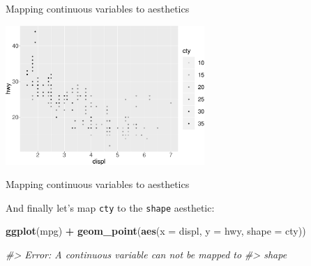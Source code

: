 \documentclass[ignorenonframetext,]{beamer}
\newenvironment{Shaded}{\begin{snugshade}}{\end{snugshade}}
\newcommand{\CommentTok}[1]{\textcolor[rgb]{0.56,0.35,0.01}{\textit{#1}}}
\newcommand{\DataTypeTok}[1]{\textcolor[rgb]{0.13,0.29,0.53}{#1}}
\newcommand{\KeywordTok}[1]{\textcolor[rgb]{0.13,0.29,0.53}{\textbf{#1}}}
\newcommand{\NormalTok}[1]{#1}
\newcommand{\OperatorTok}[1]{\textcolor[rgb]{0.81,0.36,0.00}{\textbf{#1}}}
\newcommand{\StringTok}[1]{\textcolor[rgb]{0.31,0.60,0.02}{#1}}
\begin{document}
\begin{frame}{Mapping continuous variables to aesthetics}
\protect\hypertarget{mapping-continuous-variables-to-aesthetics-6}{}

\begin{center}\includegraphics[height=200px]{data-visualization_files/figure-beamer/unnamed-chunk-26-1} \end{center}

\end{frame}

\begin{frame}[fragile]{Mapping continuous variables to aesthetics}
\protect\hypertarget{mapping-continuous-variables-to-aesthetics-7}{}

And finally let's map \texttt{cty} to the \texttt{shape} aesthetic:

\begin{Shaded}
\begin{Highlighting}[]
\KeywordTok{ggplot}\NormalTok{(mpg) }\OperatorTok{+}\StringTok{ }
\StringTok{  }\KeywordTok{geom_point}\NormalTok{(}\KeywordTok{aes}\NormalTok{(}\DataTypeTok{x =}\NormalTok{ displ, }\DataTypeTok{y =}\NormalTok{ hwy, }\DataTypeTok{shape =}\NormalTok{ cty))     }

\CommentTok{#> Error: A continuous variable can not be mapped to }
\CommentTok{#> shape}
\end{Highlighting}
\end{Shaded}

\end{frame}
\end{document}
